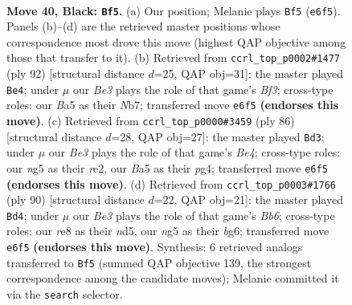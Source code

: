 \documentclass[11pt]{article}
\begin{document}
\clearpage

\begin{figure}[p]\centering
\begin{subfigure}{0.46\textwidth}\centering
\resizebox{\linewidth}{!}{%
\newchessgame
\chessboard[
  setfen={4R3/5pk1/2p1b3/bp2P1N1/8/8/8/5K2 b - - 0 40},
  showmover=false,
  pgfstyle=straightmove, color=movearrow, markmove={e6-f5}
]}
\caption{}
\end{subfigure}\hfill
\begin{subfigure}{0.46\textwidth}\centering
\resizebox{\linewidth}{!}{%
\newchessgame
\chessboard[
  setfen={5k2/1N4pp/8/4n3/2P5/1PK2BPP/r7/8 w - - 0 47},
  showmover=false,
  pgfstyle=straightmove, color=movearrow, markmove={f3-e4}
]}
\caption{}
\end{subfigure}
\\[4pt]
\begin{subfigure}{0.46\textwidth}\centering
\resizebox{\linewidth}{!}{%
\newchessgame
\chessboard[
  setfen={8/2k5/1n6/pR6/4B1p1/1P6/P3r3/1K6 w - - 5 44},
  showmover=false,
  pgfstyle=straightmove, color=movearrow, markmove={e4-d3}
]}
\caption{}
\end{subfigure}\hfill
\begin{subfigure}{0.46\textwidth}\centering
\resizebox{\linewidth}{!}{%
\newchessgame
\chessboard[
  setfen={8/3k4/pB4b1/3n4/P1p5/8/2P5/2KB4 w - - 0 46},
  showmover=false,
  pgfstyle=straightmove, color=movearrow, markmove={b6-d4}
]}
\caption{}
\end{subfigure}
\caption{\textbf{Move 40, Black: \texttt{Bf5}.} (a) Our position; Melanie plays \texttt{Bf5} (\texttt{e6f5}). Panels (b)--(d) are the retrieved master positions whose correspondence most drove this move (highest QAP objective among those that transfer to it). (b) Retrieved from \texttt{ccrl\_top\_p0002\#1477} (ply 92) [structural distance $d$=25, QAP obj=31]: the master played \texttt{Be4}; under $\mu$ our \emph{Be3} plays the role of that game's \emph{Bf3}; cross-type roles: our \emph{B}a5 as their \emph{N}b7; transferred move \texttt{e6f5} \textbf{(endorses this move)}. (c) Retrieved from \texttt{ccrl\_top\_p0000\#3459} (ply 86) [structural distance $d$=28, QAP obj=27]: the master played \texttt{Bd3}; under $\mu$ our \emph{Be3} plays the role of that game's \emph{Be4}; cross-type roles: our \emph{n}g5 as their \emph{r}e2, our \emph{B}a5 as their \emph{p}g4; transferred move \texttt{e6f5} \textbf{(endorses this move)}. (d) Retrieved from \texttt{ccrl\_top\_p0003\#1766} (ply 90) [structural distance $d$=22, QAP obj=21]: the master played \texttt{Bd4}; under $\mu$ our \emph{Be3} plays the role of that game's \emph{Bb6}; cross-type roles: our \emph{r}e8 as their \emph{n}d5, our \emph{n}g5 as their \emph{b}g6; transferred move \texttt{e6f5} \textbf{(endorses this move)}. Synthesis: 6 retrieved analogs transferred to \texttt{Bf5} (summed QAP objective 139, the strongest correspondence among the candidate moves); Melanie committed it via the \texttt{search} selector.}
\label{fig:thought-m79}
\end{figure}
\end{document}
